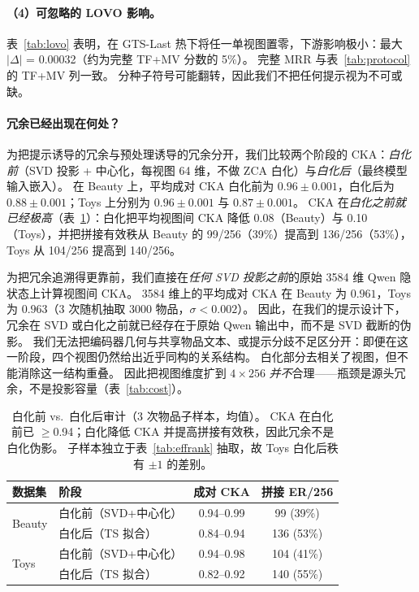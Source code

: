 \documentclass[sigconf,natbib=true,anonymous]{acmart}
\newcommand{\tfmv}{\textsc{TF+MV}\xspace}
\begin{document}
\paragraph{（4）可忽略的 LOVO 影响。}
表~\ref{tab:lovo} 表明，在 GTS-Last 热下将任一单视图置零，下游影响极小：最大 $|\Delta|$ = 0.00032（约为完整 \tfmv 分数的 5\%）。
完整 MRR 与表~\ref{tab:protocol} 的 \tfmv 列一致。
分种子符号可能翻转，因此我们不把任何提示视为不可或缺。

\paragraph{冗余已经出现在何处？}
为把提示诱导的冗余与预处理诱导的冗余分开，我们比较两个阶段的 CKA：\emph{白化前}（SVD 投影 + 中心化，每视图 64 维，不做 ZCA 白化）与\emph{白化后}（最终模型输入嵌入）。
在 Beauty 上，平均成对 CKA 白化前为 $0.96\pm0.001$，白化后为 $0.88\pm0.001$；Toys 上分别为 $0.96\pm0.001$ 与 $0.87\pm0.001$。
CKA 在\emph{白化之前就已经极高}（表~\ref{tab:cka-prepost}）：白化把平均视图间 CKA 降低 0.08（Beauty）与 0.10（Toys），并把拼接有效秩从 Beauty 的 99/256（39\%）提高到 136/256（53\%），Toys 从 104/256 提高到 140/256。

为把冗余追溯得更靠前，我们直接在\emph{任何 SVD 投影之前}的原始 3584 维 Qwen 隐状态上计算视图间 CKA。
3584 维上的平均成对 CKA 在 Beauty 为 $0.961$，Toys 为 $0.963$（3 次随机抽取 3000 物品，$\sigma < 0.002$）。
因此，在我们的提示设计下，冗余在 SVD 或白化之前就已经存在于原始 Qwen 输出中，而不是 SVD 截断的伪影。
我们无法把编码器几何与共享物品文本、或提示分歧不足区分开：即便在这一阶段，四个视图仍然给出近乎同构的关系结构。
白化部分去相关了视图，但不能消除这一结构重叠。
因此把视图维度扩到 $4\times256$ \emph{并不}合理——瓶颈是源头冗余，不是投影容量（表~\ref{tab:cost}）。

\begin{table}[t]
\centering
\caption{%
白化前 vs.\ 白化后审计（3 次物品子样本，均值）。
CKA 在白化前已 $\ge$0.94；白化降低 CKA 并提高拼接有效秩，因此冗余不是白化伪影。
子样本独立于表~\ref{tab:effrank} 抽取，故 Toys 白化后秩有 $\pm 1$ 的差别。%
}
\label{tab:cka-prepost}
\small
\begin{tabular}{@{}llcc@{}}
\toprule
数据集 & 阶段 & 成对 CKA & 拼接 ER/256 \\
\midrule
\multirow{2}{*}{Beauty}
 & 白化前（SVD+中心化）  & 0.94--0.99 & 99 (39\%) \\
 & 白化后（TS 拟合）     & 0.84--0.94 & 136 (53\%) \\
\midrule
\multirow{2}{*}{Toys}
 & 白化前（SVD+中心化）  & 0.94--0.98 & 104 (41\%) \\
 & 白化后（TS 拟合）     & 0.82--0.92 & 140 (55\%) \\
\bottomrule
\end{tabular}
\end{table}
\end{document}
